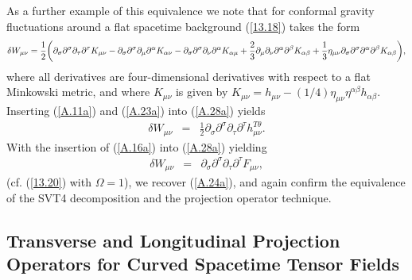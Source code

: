 \documentclass[aps,onecolumn,10pt]{revtex4}
\numberwithin{equation}{section}
\numberwithin{equation}{section}
\begin{document}
As a further example of this equivalence we note that for conformal gravity fluctuations around a flat spacetime background (\ref{13.18}) takes the form
%
\begin{eqnarray}
\delta W_{\mu\nu}=\frac{1}{2}\bigg{(}\partial_{\sigma}\partial^{\sigma}\partial_{\tau}\partial^{\tau}K_{\mu\nu}
-\partial_{\sigma}\partial^{\sigma}\partial_{\mu}\partial^{\alpha}K_{\alpha\nu}
-\partial_{\sigma}\partial^{\sigma}\partial_{\nu}\partial^{\alpha}K_{\alpha\mu}
+\frac{2}{3}\partial_{\mu}\partial_{\nu}\partial^{\alpha}\partial^{\beta}K_{\alpha\beta}+\frac{1}{3}\eta_{\mu\nu}\partial_{\sigma}\partial^{\sigma}\partial^{\alpha}\partial^{\beta}K_{\alpha\beta}\bigg{)},
\label{A.28a}
\end{eqnarray} 
%
where all derivatives are four-dimensional derivatives with respect to a flat Minkowski metric, and where $K_{\mu\nu}$ is given by $K_{\mu\nu}=h_{\mu\nu}-(1/4)\eta_{\mu\nu}\eta^{\alpha\beta}h_{\alpha\beta}$. Inserting (\ref{A.11a}) and (\ref{A.23a}) into (\ref{A.28a}) yields
%
\begin{eqnarray}
\delta W_{\mu\nu}&=&\frac{1}{2}\partial_{\sigma}\partial^{\sigma}\partial_{\tau}\partial^{\tau}h^{T\theta}_{\mu\nu}.
\label{A.29a}
\end{eqnarray} 
%
With the insertion of (\ref{A.16a}) into (\ref{A.28a}) yielding 
%
\begin{eqnarray}
\delta W_{\mu\nu}&=&\partial_{\sigma}\partial^{\sigma}\partial_{\tau}\partial^{\tau}F_{\mu\nu},
\label{A.30a}
\end{eqnarray} 
%
(cf. (\ref{13.20}) with $\Omega=1$), we recover (\ref{A.24a}), and again confirm the equivalence of the  SVT4 decomposition and the projection operator technique.

\subsection{Transverse and Longitudinal Projection Operators for Curved Spacetime Tensor Fields}
\end{document}
